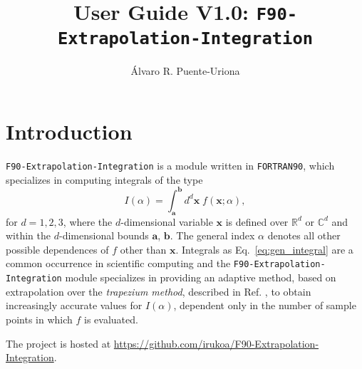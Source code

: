 \documentclass[12pt,a4paper]{article}
\title{User Guide V1.0: {\tt F90-Extrapolation-Integration}}
\author{{\'A}lvaro R. Puente-Uriona}
\date{}
\begin{document}
\maketitle
\section{Introduction}
{\tt F90-Extrapolation-Integration} is a module written in {\tt FORTRAN90}, which specializes in computing integrals of the type
\begin{equation}\label{eq:gen_integral}
I(\alpha) = \int_{\bm{a}}^{\bm{b}}d^d \bm{x}\; f\left(\bm{x};\alpha \right),
\end{equation}
for $d = 1, 2, 3$, where the $d$-dimensional variable $\bm{x}$ is defined over $\mathbb{R}^d$ or $\mathbb{C}^d$ and within the $d$-dimensional bounds $\bm{a}$, $\bm{b}$. The general index $\alpha$ denotes all other possible dependences of $f$ other than $\bm{x}$. Integrals as Eq.~\eqref{eq:gen_integral} are a common occurrence in scientific computing and the {\tt F90-Extrapolation-Integration} module specializes in providing an adaptive method, based on extrapolation over the \textit{trapezium method}, described in Ref. \cite{puente-uriona2023}, to obtain increasingly accurate values for $I(\alpha)$, dependent only in the number of sample points in which $f$ is evaluated.

The project is hosted at \url{https://github.com/irukoa/F90-Extrapolation-Integration}.
\end{document}
